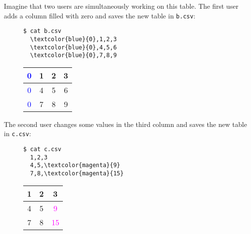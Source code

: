 \documentclass{sigplanconf}
\theoremstyle{plain}
\begin{document}
Imagine that two users are simultaneously working on this table.
The first user adds a column filled with zero and saves the new table in \texttt{b.csv}:
\begin{figure}[h]
\centering
\begin{minipage}{.15\textwidth}
  \centering
\begin{Verbatim}[commandchars=\\\{\}]
  $ cat b.csv
  \textcolor{blue}{0},1,2,3
  \textcolor{blue}{0},4,5,6
  \textcolor{blue}{0},7,8,9
\end{Verbatim}
\end{minipage}%
\begin{minipage}{.15\textwidth}
  \centering
  \begin{tabular}{ | c | c | c | c | }
    \hline
    \textcolor{blue}{0} & 1 & 2 & 3 \\ \hline
    \textcolor{blue}{0} & 4 & 5 & 6 \\ \hline
    \textcolor{blue}{0} & 7 & 8 & 9  \\ \hline
  \end{tabular}
\end{minipage}%
\end{figure} 

The second user changes some values in the third column and saves the new table in  \texttt{c.csv}:
\begin{figure}[h]
\centering
\begin{minipage}{.15\textwidth}
  \centering
  \begin{Verbatim}[commandchars=\\\{\}]
  $ cat c.csv
  1,2,3
  4,5,\textcolor{magenta}{9}
  7,8,\textcolor{magenta}{15}
  \end{Verbatim}
\end{minipage}%
\begin{minipage}{.15\textwidth}
  \centering
  \begin{tabular}{ | c | c | c | }
    \hline
    1 & 2 & 3 \\ \hline
    4 & 5 & \textcolor{magenta}{9} \\ \hline
    7 & 8 & \textcolor{magenta}{15} \\ \hline
  \end{tabular}
\end{minipage}%
\end{figure}
\end{document}

